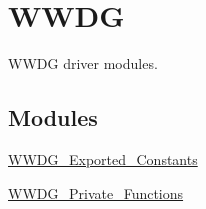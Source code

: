 \hypertarget{group___w_w_d_g}{\section{W\-W\-D\-G}
\label{group___w_w_d_g}
}


W\-W\-D\-G driver modules.  


\subsection*{Modules}
\begin{DoxyCompactItemize}
\item 
\hyperlink{group___w_w_d_g___exported___constants}{W\-W\-D\-G\-\_\-\-Exported\-\_\-\-Constants}
\item 
\hyperlink{group___w_w_d_g___private___functions}{W\-W\-D\-G\-\_\-\-Private\-\_\-\-Functions}
\end{DoxyCompactItemize}
